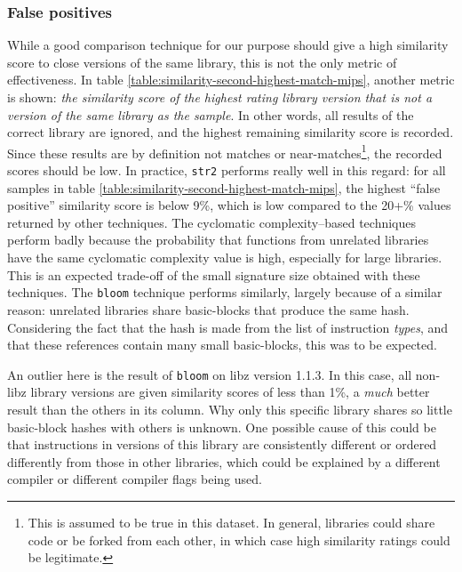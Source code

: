 \documentclass[twocolumn,a4paper]{IEEEtran} %
\begin{document}
\subsubsection{False positives}
\label{sec:results-false-pos}
While a good comparison technique for our purpose should give a high similarity score to close versions of the same library, this is not the only metric of effectiveness. In table \ref{table:similarity-second-highest-match-mips}, another metric is shown: \emph{the similarity score of the highest rating library version that is not a version of the same library as the sample}. In other words, all results of the correct library are ignored, and the highest remaining similarity score is recorded. Since these results are by definition not matches or near-matches\footnote{This is assumed to be true in this dataset. In general, libraries could share code or be forked from each other, in which case high similarity ratings could be legitimate.}, the recorded scores should be low. In practice, \texttt{str2} performs really well in this regard: for all samples in table \ref{table:similarity-second-highest-match-mips}, the highest ``false positive'' similarity score is below 9\%, which is low compared to the 20+\% values returned by other techniques. The cyclomatic complexity--based techniques perform badly because the probability that functions from unrelated libraries have the same cyclomatic complexity value is high, especially for large libraries. This is an expected trade-off of the small signature size obtained with these techniques. The \texttt{bloom} technique performs similarly, largely because of a similar reason: unrelated libraries share basic-blocks that produce the same hash. Considering the fact that the hash is made from the list of instruction \emph{types}, and that these references contain many small basic-blocks, this was to be expected.

An outlier here is the result of \texttt{bloom} on libz version 1.1.3. In this case, all non-libz library versions are given similarity scores of less than 1\%, a \emph{much} better result than the others in its column. Why only this specific library shares so little basic-block hashes with others is unknown. One possible cause of this could be that instructions in versions of this library are consistently different or ordered differently from those in other libraries, which could be explained by a different compiler or different compiler flags being used.
\end{document}

